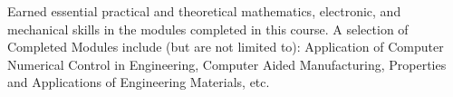 \documentclass[10pt,a4paper,ragged2e,withhyper]{altacv}
\begin{document}
\divider

Earned essential practical and theoretical mathematics, electronic, and mechanical skills in the modules completed in this course. A selection of Completed Modules include (but are not limited to): Application of Computer Numerical Control in Engineering, Computer Aided Manufacturing, Properties and Applications of Engineering Materials, etc.

\medskip
\vspace{-0.5em}


\end{document}
